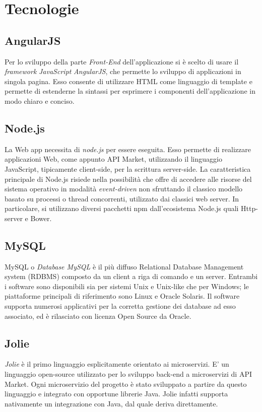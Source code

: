 \newpage
\section{Tecnologie}
\subsection{AngularJS}
Per lo sviluppo della parte \textit{Front-End} dell'applicazione si è scelto di usare il \textit{framework} \textit{JavaScript} \textit{AngularJS}, che permette lo sviluppo di applicazioni in singola pagina. Esso consente di utilizzare HTML come linguaggio di template e permette di estenderne la sintassi per esprimere i componenti dell'applicazione in modo chiaro e conciso.

\subsection{Node.js}
La Web app necessita di \textit{node.js} per essere eseguita. Esso permette di realizzare applicazioni Web, come appunto API Market, utilizzando il linguaggio JavaScript, tipicamente client-side, per la scrittura server-side. La caratteristica principale di Node.js risiede nella possibilità che offre di accedere alle risorse del sistema operativo in modalità \textit{event-driven} non sfruttando il classico modello basato su processi o thread concorrenti, utilizzato dai classici web server. In particolare, si utilizzano diversi pacchetti npm dall'ecosistema Node.js quali Http-server e Bower. 

\subsection{MySQL}
MySQL o \textit{Database MySQL} è il più diffuso Relational Database Management system (RDBMS) composto da un client a riga di comando e un server. Entrambi i software sono disponibili sia per sistemi Unix e Unix-like che per Windows; le piattaforme principali di riferimento sono Linux e Oracle Solaris. Il software supporta numerosi applicativi per la corretta gestione dei database ad esso associato, ed è rilasciato con licenza Open Source da Oracle. 


\subsection{Jolie}
\textit{Jolie} è il primo linguaggio esplicitamente orientato ai microservizi. E' un linguaggio open-source utilizzato per lo sviluppo back-end a microservizi di API Market. Ogni microservizio del progetto è stato sviluppato a partire da questo linguaggio e integrato con opportune librerie Java. Jolie infatti supporta nativamente un integrazione con Java, dal quale deriva direttamente. 

